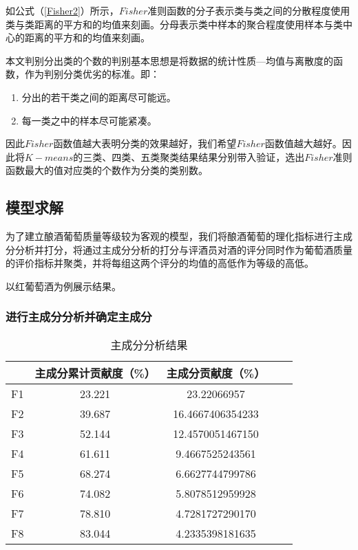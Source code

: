 \documentclass[withoutpreface,bwprint]{cumcmthesis} %
\begin{document}
\par 如公式（\ref{Fisher2}）所示，$Fisher$准则函数的分子表示类与类之间的分散程度使用类与类距离的平方和的均值来刻画。分母表示类中样本的聚合程度使用样本与类中心的距离的平方和的均值来刻画。

\par 本文判别分出类的个数的判别基本思想是将数据的统计性质—均值与离散度的函数，作为判别分类优劣的标准。即：
\begin{enumerate}
	\item 分出的若干类之间的距离尽可能远。
	\item 每一类之中的样本尽可能紧凑。
\end{enumerate}

\par 因此$Fisher$函数值越大表明分类的效果越好，我们希望$Fisher$函数值越大越好。因此将$K-means$的三类、四类、五类聚类结果结果分别带入验证，选出$Fisher$准则函数最大的值对应类的个数作为分类的类别数。

\subsection{模型求解}

\par 为了建立酿酒葡萄质量等级较为客观的模型，我们将酿酒葡萄的理化指标进行主成分分析并打分，将通过主成分分析的打分与评酒员对酒的评分同时作为葡萄酒质量的评价指标并聚类，并将每组这两个评分的均值的高低作为等级的高低。

\par 以红葡萄酒为例展示结果。
\subsubsection{进行主成分分析并确定主成分}
\begin{table}[!htbp]
\centering
\caption{主成分分析结果}
\label{主成分分析结果}
\begin{tabular}{ccccc}
\toprule
 & 主成分累计贡献度（\%） & 主成分贡献度（\%）\\
\midrule
F1&23.221&23.22066957\\
F2&39.687&16.4667406354233\\ 
F3&52.144&12.4570051467150\\ 
F4&61.611&9.4667525243561\\ 
F5&68.274&6.6627744799786\\ 
F6&74.082&5.8078512959928\\ 
F7&78.810&4.7281727290170\\ 
F8&83.044&4.2335398181635\\ 
\bottomrule 
\end{tabular}
\end{table}
\end{document}
